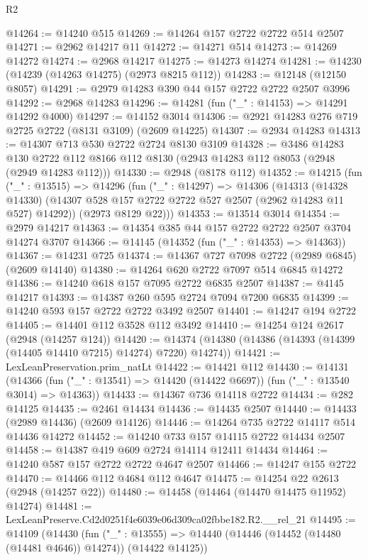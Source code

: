 \begin{lexlean}{R2}
\begin{coremodule}
@14264 := @14240 @515
@14269 := @14264 @157 @2722 @2722 @514 @2507
@14271 := @2962 @14217 @11
@14272 := @14271 @514
@14273 := @14269 @14272
@14274 := @2968 @14217
@14275 := @14273 @14274
@14281 := @14230 (@14239 (@14263 @14275) (@2973 @8215 @112))
@14283 := @12148 (@12150 @8057)
@14291 := @2979 @14283 @390 @44 @157 @2722 @2722 @2507 @3996
@14292 := @2968 @14283
@14296 := @14281 (fun ("_" : @14153) => @14291 @14292 @4000)
@14297 := @14152 @3014
@14306 := @2921 @14283 @276 @719 @2725 @2722 (@8131 @3109) (@2609 @14225)
@14307 := @2934 @14283
@14313 := @14307 @713 @530 @2722 @2724 @8130 @3109
@14328 := @3486
    @14283
    @130
    @2722
    @112
    @8166
    @112
    @8130
    (@2943 @14283 @112 @8053 (@2948 (@2949 @14283 @112)))
@14330 := @2948 (@8178 @112)
@14352 := @14215
    (fun ("_" : @13515) =>
    @14296
      (fun ("_" : @14297) =>
      @14306
        (@14313
          (@14328 @14330)
          (@14307 @528 @157 @2722 @2722 @527 @2507 (@2962 @14283 @11 @527) @14292))
        (@2973 @8129 @22)))
@14353 := @13514 @3014
@14354 := @2979 @14217
@14363 := @14354 @385 @44 @157 @2722 @2722 @2507 @3704 @14274 @3707
@14366 := @14145 (@14352 (fun ("_" : @14353) => @14363))
@14367 := @14231 @725
@14374 := @14367 @727 @7098 @2722 (@2989 @6845) (@2609 @14140)
@14380 := @14264 @620 @2722 @7097 @514 @6845 @14272
@14386 := @14240 @618 @157 @7095 @2722 @6835 @2507
@14387 := @4145 @14217
@14393 := @14387 @260 @595 @2724 @7094 @7200 @6835
@14399 := @14240 @593 @157 @2722 @2722 @3492 @2507
@14401 := @14247 @194 @2722
@14405 := @14401 @112 @3528 @112 @3492
@14410 := @14254 @124 @2617 (@2948 (@14257 @124))
@14420 := @14374 (@14380 (@14386 (@14393 (@14399 (@14405 @14410 @7215) @14274) @7220) @14274))
@14421 := LexLeanPreservation.prim_natLt
@14422 := @14421 @112
@14430 := @14131
    (@14366 (fun ("_" : @13541) => @14420 (@14422 @6697)) (fun ("_" : @13540 @3014) => @14363))
@14433 := @14367 @736 @14118 @2722
@14434 := @282 @14125
@14435 := @2461 @14434
@14436 := @14435 @2507
@14440 := @14433 (@2989 @14436) (@2609 @14126)
@14446 := @14264 @735 @2722 @14117 @514 @14436 @14272
@14452 := @14240 @733 @157 @14115 @2722 @14434 @2507
@14458 := @14387 @419 @609 @2724 @14114 @12411 @14434
@14464 := @14240 @587 @157 @2722 @2722 @4647 @2507
@14466 := @14247 @155 @2722
@14470 := @14466 @112 @4684 @112 @4647
@14475 := @14254 @22 @2613 (@2948 (@14257 @22))
@14480 := @14458 (@14464 (@14470 @14475 @11952) @14274)
@14481 := LexLeanPreserve.Cd2d0251f4e6039e06d309ca02fbbe182.R2.__rel_21
@14495 := @14109
    (@14430
      (fun ("_" : @13555) =>
      @14440 (@14446 (@14452 (@14480 (@14481 @4646)) @14274)) (@14422 @14125))

\end{coremodule}
\end{lexlean}
